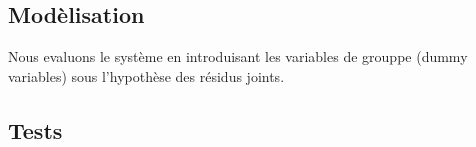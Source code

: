 \documentclass[11pt,]{article}
\begin{document}
\FloatBarrier

\hypertarget{modelisation-3}{%
\subsection{Modèlisation}\label{modelisation-3}}

\FloatBarrier

Nous evaluons le système en introduisant les variables de grouppe (dummy
variables) sous l'hypothèse des résidus joints.

\FloatBarrier

\FloatBarrier

\hypertarget{tests-1}{%
\subsection{Tests}\label{tests-1}}

\FloatBarrier
\end{document}
